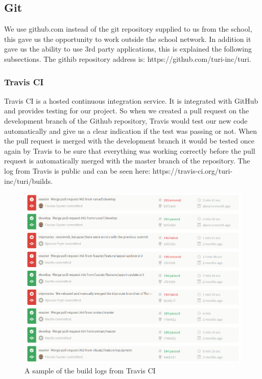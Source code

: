 \documentclass[a4paper]{article}
\begin{document}
\subsection{Git}
We use github.com instead of the git repository supplied to us from the school, this gave us the opportunity to work outside the school network. In addition it gave us the ability to use 3rd party applications, this is explained the following subsections. The githib repository address is: https://github.com/turi-inc/turi.

\subsubsection{Travis CI}
Travis CI is a hosted continuous integration service. It is integrated with GitHub and provides testing for our project. So when we created a pull request on the development branch of the Github repository, Travis would test our new code automatically and give us a clear indication if the test was passing or not. When the pull request is merged with the development branch it would be tested once again by Travis to be sure that everything was working correctly before the pull request is automatically merged with the master branch of the repository. The log from Travis is public and can be seen here: https://travis-ci.org/turi-inc/turi/builds.

\begin{figure}
  \begin{center}
    \includegraphics[scale=0.45]{pictures/Travis_buildlog.png}
    \caption{A sample of the build logs from Travis CI}
    \label{fig:}
  \end{center}
\end{figure}
\end{document}
